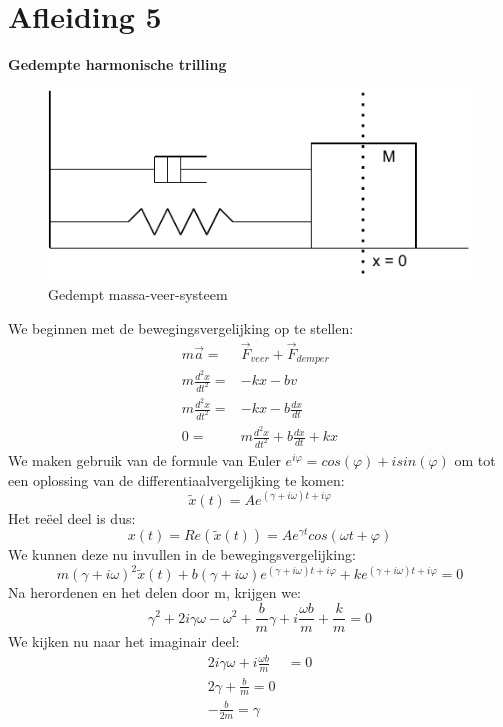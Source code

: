 \documentclass[a4paper,kul]{kulakarticle} %
\begin{document}
\section{Afleiding 5}
\textbf{Gedempte harmonische trilling}\\
\begin{figure}[htbp]
	\centering
	\includegraphics[width=0.7\linewidth]{DempingVeer}
	\caption[Gedempt massa veer systeem]{Gedempt massa-veer-systeem}
	\label{fig:dempingveer}
\end{figure}
We beginnen met de bewegingsvergelijking op te stellen:
\begin{align*}
	m \vec{a} =& \vec{F}_{veer} + \vec{F}_{demper}\\
	m \frac{d^2x}{dt^2} = & -kx - bv\\
	m \frac{d^2x}{dt^2} = & -kx - b\frac{dx}{dt}\\
	0 = & m \frac{d^2x}{dt^2} + b\frac{dx}{dt} + kx
\end{align*}
We maken gebruik van de formule van Euler $e^{i\varphi}=cos(\varphi) +isin(\varphi)$ om tot een oplossing van de differentiaalvergelijking te komen:
\begin{equation*}
	\widetilde{x}(t) = Ae^{(\gamma +i\omega)t+i\varphi}
\end{equation*}
Het reëel deel is dus:
\begin{equation*}
	x(t) = Re(\widetilde{x}(t)) = Ae^{\gamma t}cos(\omega t + \varphi)
\end{equation*}
We kunnen deze nu invullen in de bewegingsvergelijking:
\begin{equation}
	\label{eq:complexbeweging}
	m(\gamma +i\omega)^2\widetilde{x}(t) + b(\gamma +i\omega)e^{(\gamma +i\omega)t+i\varphi}+ke^{(\gamma +i\omega)t+i\varphi} = 0
\end{equation}
Na herordenen en het delen door m, krijgen we:
\begin{equation*}
	\gamma^2+2i\gamma\omega-\omega^2+\frac{b}{m}\gamma+i\frac{\omega b}{m}+\frac{k}{m}=0
\end{equation*}
We kijken nu naar het imaginair deel:
\begin{align*}
	2i\gamma \omega +i\frac{\omega b}{m}&=0\\
	2\gamma + \frac{b}{m} = 0\\
	-\frac{b}{2m} = \gamma
\end{align*}
\end{document}
